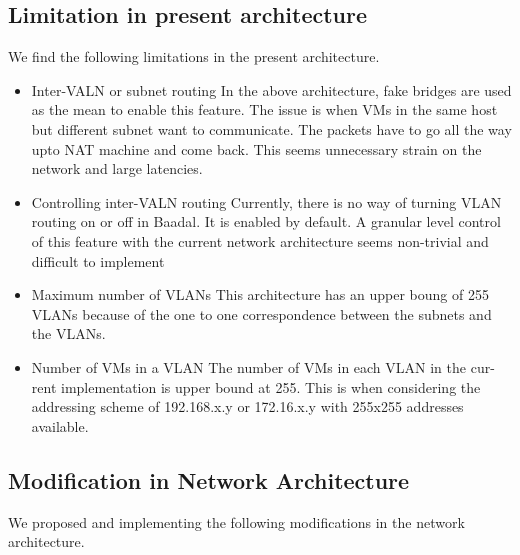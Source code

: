\pagebreak 

\subsection{Limitation in present architecture}
We find the following limitations in the present architecture.

\begin{itemize}
\item Inter-VALN or subnet routing In the above architecture, fake bridges are
used as the mean to enable this feature. The issue is when VMs in the
same host but different subnet want to communicate. The packets have to
go all the way upto NAT machine and come back. This seems unnecessary
strain on the network and large latencies.

\item  Controlling inter-VALN routing Currently, there is no way of turning VLAN
routing on or off in Baadal. It is enabled by default. A granular level control of this feature with the current network architecture seems non-trivial
and difficult to implement



\item Maximum number of VLANs This architecture has an upper boung of 255
VLANs because of the one to one correspondence between the subnets
and the VLANs.


\item Number of VMs in a VLAN The number of VMs in each VLAN in the cur-
rent implementation is upper bound at 255. This is when considering the
addressing scheme of 192.168.x.y or 172.16.x.y with 255x255 addresses
available.

\end{itemize}

\subsection{Modification in Network Architecture}
We proposed and implementing the following modifications in the network architecture.

